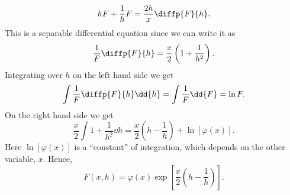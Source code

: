 \documentclass[fleqn]{NotesClass}
\begin{document}
    \begin{equation}
        hF + \frac{1}{h}F = \frac{2h}{x}\diffp{F}{h}.
    \end{equation}
    This is a separable differential equation since we can write it as
    \begin{equation}
        \frac{1}{F} \diffp{F}{h} = \frac{x}{2} \left( 1 + \frac{1}{h^2} \right).
    \end{equation}
    Integrating over \(h\) on the left hand side we get
    \begin{equation}
        \int \frac{1}{F} \diffp{F}{h} \dd{h} = \int \frac{1}{F} \dd{F} = \ln F.
    \end{equation}
    On the right hand side we get
    \begin{equation}
        \frac{x}{2} \int 1 + \frac{1}{h^2} \dd{h} = \frac{x}{2}\left( h - \frac{1}{h} \right) + \ln[\varphi(x)].
    \end{equation}
    Here \(\ln[\varphi(x)]\) is a \enquote{constant} of integration, which depends on the other variable, \(x\).
    Hence,
    \begin{equation}\label{eqn:bessel generating function derivation}
        F(x, h) = \varphi(x) \exp\left[ \frac{x}{2}\left( h - \frac{1}{h} \right) \right].
    \end{equation}
    
\end{document}

